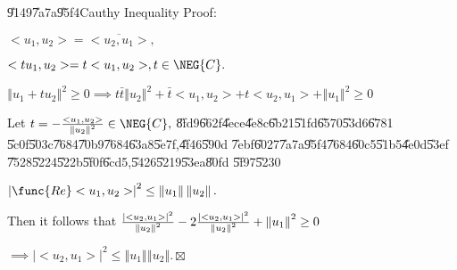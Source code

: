 \documentclass{article}
\begin{document}
\U{9149}\U{7a7a}\U{95f4}Cauthy Inequality Proof:

$<u_{1},u_{2}>=\overline{<u_{2},u_{1}>},$

$<tu_{1},u_{2}>=t<u_{1},u_{2}>,t\in \NEG{C}.$

$\left\Vert u_{1}+tu_{2}\right\Vert ^{2}\geq 0\implies t\bar{t}\left\Vert
u_{2}\right\Vert ^{2}+\bar{t}<u_{1},u_{2}>+t<u_{2},u_{1}>+\left\Vert
u_{1}\right\Vert ^{2}\geq 0$

Let $t=-\frac{<u_{1},u_{2}>}{\left\Vert u_{2}\right\Vert ^{2}}\in \NEG{C},$%
\U{8fd9}\U{662f}\U{4ece}\U{4e8c}\U{6b21}\U{51fd}\U{6570}\U{53d6}\U{6781}%
\U{5c0f}\U{503c}\U{7684}\U{70b9}\U{7684}\U{63a8}\U{5e7f},\U{4f46}\U{590d}%
\U{7ebf}\U{6027}\U{7a7a}\U{95f4}\U{7684}\U{60c5}\U{51b5}\U{4e0d}\U{53ef}%
\U{7528}\U{5224}\U{522b}\U{5f0f}\U{6cd5},\U{5426}\U{5219}\U{53ea}\U{80fd}%
\U{5f97}\U{5230}

$\left\vert \func{Re}<u_{1},u_{2}>\right\vert ^{2}\leq \left\Vert
u_{1}\right\Vert \left\Vert u_{2}\right\Vert .$

Then it follows that $\frac{\left\vert <u_{2},u_{1}>\right\vert ^{2}}{%
\left\Vert u_{2}\right\Vert ^{2}}-2\frac{\left\vert <u_{2},u_{1}>\right\vert
^{2}}{\left\Vert u_{2}\right\Vert ^{2}}+\left\Vert u_{1}\right\Vert ^{2}\geq
0$

$\implies \left\vert <u_{2},u_{1}>\right\vert ^{2}\leq \left\Vert
u_{1}\right\Vert \left\Vert u_{2}\right\Vert .\boxtimes $
\end{document}
